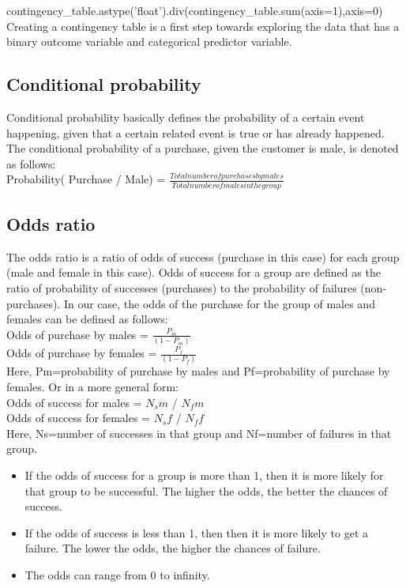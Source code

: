 \documentclass{article}
\numberwithin{equation}{section} %
\begin{document}
contingency\_table.astype('float').div(contingency\_table.sum(axis=1),axis=0) \\


Creating a contingency table is a first step towards exploring the data that has a
binary outcome variable and categorical predictor variable. \\

\subsection*{Conditional probability}

Conditional probability basically defines the probability of a certain event happening, given that a certain related event is true or has already happened. The conditional probability of a purchase, given the customer is male, is denoted as follows: \\

Probability( Purchase / Male) = $\frac{Total number of purchases by males
}{Total number of males in the group}$


\subsection*{Odds ratio}

The odds ratio is a ratio of odds of success (purchase in this case) for each group
(male and female in this case). Odds of success for a group are defined as the ratio of probability of successes (purchases) to the probability of failures (non-purchases). In our case, the odds of the purchase for the group of males and females can be defined as follows: \\

Odds of purchase by males = $\frac{P_m}{(1 - P_m )}$ \\

Odds of purchase by females =  $\frac{P_f}{(1-P_f)}$ \\

Here, Pm=probability of purchase by males and Pf=probability of purchase by females. Or in a more general form: \\

Odds of success for males = $N_sm$ / $N_fm$ \\

Odds of success for females = $N_sf$ / $N_ff$ \\

Here, Ns=number of successes in that group and Nf=number of failures in that group. 

\begin{itemize}
	\item If the odds of success for a group is more than 1, then it is more likely for that group to be successful. The higher the odds, the better the chances of success.
	\item If the odds of success is less than 1, then then it is more likely to get a failure. The lower the odds, the higher the chances of failure.
	\item The odds can range from 0 to infinity.
\end{itemize}
\end{document}
